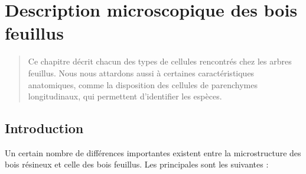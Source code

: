 \chapter{Description microscopique des bois feuillus}\label{feuillus}

\begin{abstract}
Ce chapitre décrit chacun des types de cellules rencontrés chez les arbres feuillus. Nous nous attardons aussi à certaines caractéristiques anatomiques, comme la disposition des cellules de parenchymes longitudinaux, qui permettent d'identifier les espèces.
\end{abstract}

\minitoc

\section{Introduction}

Un certain nombre de différences importantes existent entre la microstructure des bois résineux et celle des bois feuillus. Les principales sont les suivantes :\\

